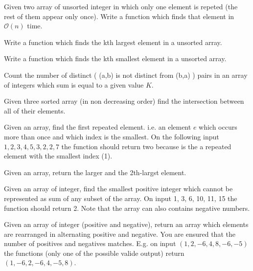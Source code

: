  \begin{problem}
	Given two array of unsorted integer in which only one element is repeted (the rest of them appear only once). Write a function which finds that element in $\mathcal{O}(n)$  time.
\end{problem}

 \begin{problem}
	Write a function which finds the kth largest element in a unsorted array.
\end{problem}
 \begin{problem}
	Write a function which finds the kth smallest element in a unsorted array.
\end{problem}

 \begin{problem}
Count the number of distinct ( (a,b) is not distinct from (b,a) ) pairs in an array of integers which sum is equal to a given value $K$.
\end{problem}

 \begin{problem}
Given three sorted array (in non decreasing order) find the intersection between all of their elements.
\end{problem}

 \begin{problem}
Given an array, find the first repeated element. i.e. an element $e$ which occurs more than once and which index is the smallest. On the following input $1,2,3,4,5,3,2,2,7$ the function should return two because is the a repeated element with the smallest index (1).
\end{problem}

 \begin{problem}
Given an array, return the larger and the 2th-largst element.
\end{problem}


 \begin{problem}
Given an array of integer, find the smallest positive integer which cannot be represented as sum of any subset of the array. On  input 1, 3, 6, 10, 11, 15 the function should return 2. Note that the array can also contains negative numbers.
\end{problem}

 \begin{problem}
Given an array of integer (positive and negative), return an array which elements are rearranged in alternating positive and negative. You are ensured that the number of positives and negatives matches. E.g. on input $(1,2,-6,4,8,-6,-5)$ the functions (only one of the possible valide output) return $(1,-6,2,-6,4,-5,8)$.
\end{problem}

